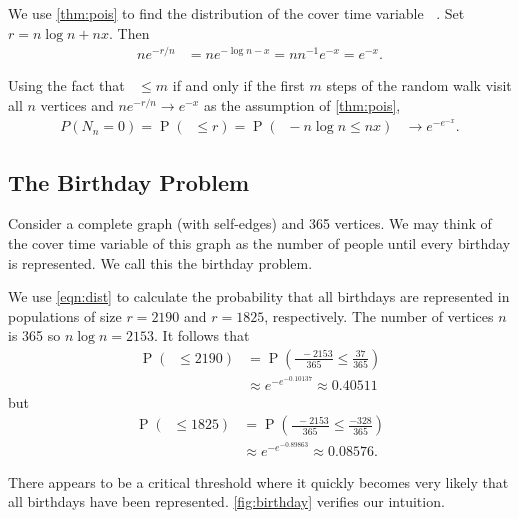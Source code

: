 \documentclass[12pt]{article}
\theoremstyle{definition}
\DeclareMathOperator{\pr}{\mathrm{P}}		     %
\DeclareMathOperator{\cov}{\uptau_\textrm{cov}}  %
\begin{document}
We use \cref{thm:pois} to find the distribution of the cover time variable $\cov$.
Set $r = n \log n + nx$.
Then 
\begin{align}
ne^{-r/n} &= n e ^{- \log n - x} = n n ^{-1} e^ {- x} = e^{-x}.\nonumber
\end{align}

Using the fact that $\cov \leq m$ if and only if the first $m$ steps
of the random walk visit all $n$ vertices
and $ne^{-r/n} \rightarrow e^{-x}$ as the assumption of \cref{thm:pois},
\begin{align}
P(N_n=0) = \pr(\cov \leq r) = \pr(\cov - n \log n\leq nx) 
&\rightarrow e^{-e^{-x}}. \label{eqn:dist}
\end{align}

\subsection{The Birthday Problem}\label{sec:birthday}
Consider a complete graph (with self-edges) and 365 vertices.
We may think of the cover time variable of this graph as the number of people
until every birthday is represented.
We call this the birthday problem.

We use \cref{eqn:dist} to calculate the probability
that all birthdays are represented in populations of 
size $r=2190$ and $r=1825$, respectively.
The number of vertices $n$ is 365 so $n\log n = 2153$.
It follows that
\begin{align}
\pr(\cov \leq 2190) &= \pr \left(\frac{\cov - 2153}{365} \leq
\frac{37}{365}\right) \nonumber \\
&\approx e^{-e^{-0.10137}} \approx 0.40511 \nonumber
\end{align}
but 
\begin{align}
\pr(\cov \leq 1825) &= \pr \left(\frac{\cov - 2153}{365} \leq
\frac{-328}{365}\right) \nonumber \\
&\approx e^{-e^{-0.89863}} \approx 0.08576. \nonumber
\end{align}

There appears to be a critical threshold where it quickly becomes very likely
that all birthdays have been represented.
\cref{fig:birthday} verifies our intuition.
\end{document}
